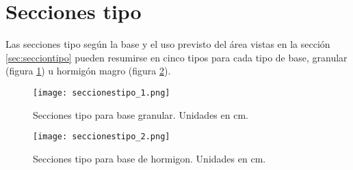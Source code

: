 \section{Secciones tipo}

Las secciones tipo según la base y el uso previsto del área vistas en la sección \ref{sec:secciontipo} pueden resumirse en cinco tipos para cada tipo de base, granular (figura \ref{fig:seccionestipogranular}) u hormigón magro (figura \ref{fig:seccionestipohormigon}).

\begin{figure}[!htb]
\centering
\texttt{[image: seccionestipo\_1.png]}
\caption{Secciones tipo para base granular. Unidades en cm.}
\label{fig:seccionestipogranular}
\end{figure}

\begin{figure}[!htb]
\centering
\texttt{[image: seccionestipo\_2.png]}
\caption{Secciones tipo para base de hormigon. Unidades en cm.}
\label{fig:seccionestipohormigon}
\end{figure}
